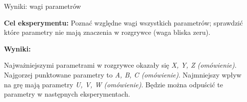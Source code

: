 \begin{frame}{Wyniki: wagi parametrów}

    \textbf{Cel eksperymentu:} Poznać względne wagi wszystkich parametrów; sprawdzić które parametry nie mają znaczenia w rozgrywce (waga bliska zeru).

    \textbf{Wyniki:}
    \begin{itemize}
        \myitem Najważniejszymi parametrami w rozgrywce okazały się \textit{X, Y, Z (omówienie)}.
        \myitem Najgorzej punktowane parametry to \textit{A, B, C (omówienie)}.
        \myitem Najmniejszy wpływ na grę mają parametry \textit{U, V, W (omówienie)}. Będzie można odpuścić te parametry w następnych eksperymentach.
    \end{itemize}






\end{frame}
